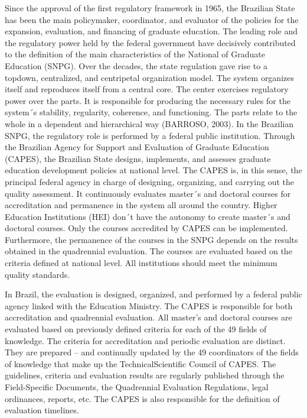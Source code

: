 Since the approval of the first regulatory framework in 1965, the Brazilian State has been the main policymaker, coordinator, and evaluator of the policies for the expansion, evaluation, and financing of graduate education. The leading role and the regulatory power held by the federal government have decisively contributed to the definition of the main characteristics of the National of Graduate Education (SNPG). Over the decades, the state regulation gave rise to a topdown, centralized, and centripetal organization model. The system organizes itself and reproduces itself from a central core. The center exercises regulatory power over the parts. It is responsible for producing the necessary rules for the system´s stability, regularity, coherence, and functioning. The parts relate to the whole in a dependent and hierarchical way (BARROSO, 2003). In the Brazilian SNPG, the regulatory role is performed by a federal public institution. Through the Brazilian Agency for Support and Evaluation of Graduate Education (CAPES), the Brazilian State designs, implements, and assesses graduate education development policies at national level. The CAPES is, in this sense, the principal federal agency in charge of designing, organizing, and carrying out the quality assessment. It continuously evaluates master´s and doctoral courses for accreditation and permanence in the system all around the country. Higher Education Institutions (HEI) don´t have the autonomy to create master´s and doctoral courses. Only the courses accredited by CAPES can be implemented. Furthermore, the permanence of the courses in the SNPG depends on the results obtained in the quadrennial evaluation. The courses are evaluated based on the criteria defined at national level. All institutions should meet the minimum quality standards. 

In Brazil, the evaluation is designed, organized, and performed by a federal public agency linked with the Education Ministry. The CAPES is responsible for both accreditation and quadrennial evaluation. All master’s and doctoral courses are evaluated based on previously defined criteria for each of the 49 fields of knowledge. The criteria for accreditation and periodic evaluation are distinct. They are prepared – and continually updated by the 49 coordinators of the fields of knowledge that make up the TechnicalScientific Council of CAPES. The guidelines, criteria and evaluation results are regularly published through the Field-Specific Documents, the Quadrennial Evaluation Regulations, legal ordinances, reports, etc. The CAPES is also responsible for the definition of evaluation timelines.  

